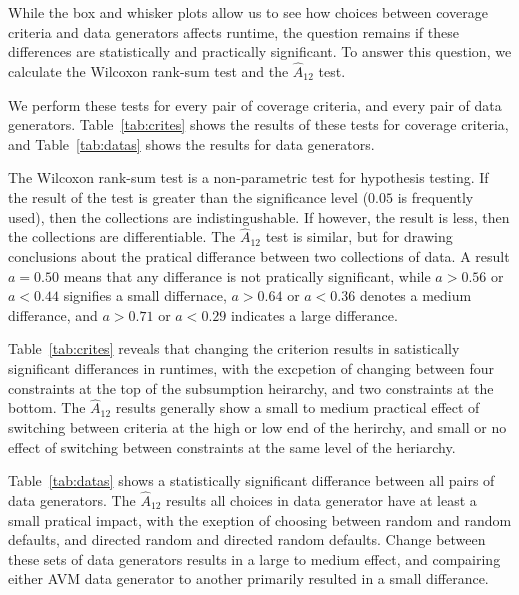 
While the box and whisker plots allow us to see how choices between coverage criteria and data generators affects
runtime, the question remains if these differences are statistically and practically significant. To answer this
question, we calculate the Wilcoxon rank-sum test and the $\hat{A}_{12}$ test.

We perform these tests for every pair of coverage criteria, and every pair of data generators.  Table~\ref{tab:crites}
shows the results of these tests for coverage criteria, and Table~\ref{tab:datas} shows the results for data generators.

The Wilcoxon rank-sum test is a non-parametric test for hypothesis testing.  If the result of the test is greater than
the significance level ($0.05$ is frequently used), then the collections are indistingushable.  If however, the result
is less, then the collections are differentiable.  The $\hat{A}_{12}$ test is similar, but for drawing conclusions about
the pratical differance between two collections of data.  A result $a=0.5$0 means that any differance is not pratically
significant, while $a>0.56$ or $a<0.44$ signifies a small differnace, $a>0.64$ or $a<0.36$ denotes a medium differance,
and $a>0.71$ or $a<0.29$ indicates a large differance.

Table~\ref{tab:crites} reveals that changing the criterion results in satistically significant differances in runtimes,
with the excpetion of changing between four constraints at the top of the subsumption heirarchy, and two constraints at
the bottom.  The $\hat{A}_{12}$ results generally show a small to medium practical effect of switching between
criteria at the high or low end of the herirchy, and small or no effect of switching between constraints at the same
level of the heriarchy.


Table~\ref{tab:datas} shows a statistically significant differance between all pairs of data generators. The
$\hat{A}_{12}$ results all choices in data generator have at least a small pratical impact, with the exeption of
choosing between random and random defaults, and directed random and directed random defaults.  Change between these
sets of data generators results in a large to medium effect, and compairing either AVM data generator to another
primarily resulted in a small differance.

